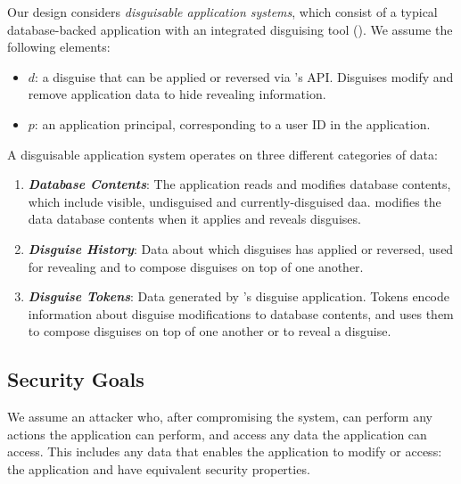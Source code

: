 Our design considers \emph{disguisable application systems}, which consist of a typical database-backed
application with an integrated disguising tool (\sys).
We assume the following elements:
\begin{itemize}
    \item $d$: a disguise that can be applied or reversed via \sys's API. Disguises modify and remove
    application data to hide revealing information. 
    \item $p$: an application principal, corresponding to a user ID in the application. 
\end{itemize}

\noindent
A disguisable application system operates on three different categories of data:
\begin{enumerate}
    \item \emph{\textbf{Database Contents}}: The application reads and modifies database
        contents, which include visible, undisguised and currently-disguised daa.
        \sys modifies the data database contents when it applies and reveals disguises.
    \item \emph{\textbf{Disguise History}}: Data about which disguises \sys has applied or
        reversed, used for revealing and to compose disguises on top of one another. 
    \item \emph{\textbf{Disguise Tokens}}: Data generated by \sys's
        disguise application. Tokens encode information about disguise modifications to database
        contents, and \sys uses them to compose disguises on top of one another or to reveal a
        disguise. 
\end{enumerate}

\subsection{Security Goals}
We assume an attacker who, after compromising the system, can perform any actions the
application can perform, and access any data the application can access. This includes any data that
\sys enables the application to modify or access: the application and \sys have equivalent security
properties.

